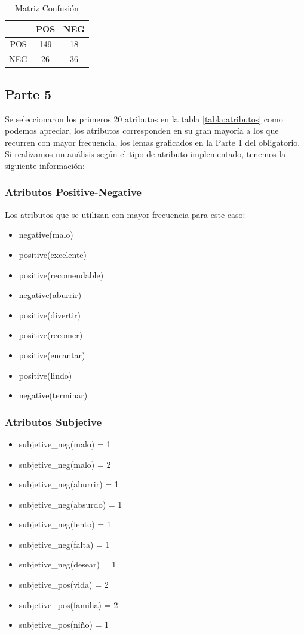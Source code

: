 \documentclass[12pt]{article}
\begin{document}
\begin{table}[!htb]
\begin{center}
\begin{tabular}{|c|c|c|} 
\cline{2-3}
 \multicolumn{1}{l}{}&
 \multicolumn{1}{|l}{POS}&
 \multicolumn{1}{|l|}{NEG}
\tabularnewline
  \hline
  POS & 149 & 18 \\ \hline
  NEG & 26 & 36 \\ \hline
\end{tabular} 
\end{center}
\caption{Matriz Confusión} 
\label{tabla:matrix}
\end{table}

\subsection{Parte 5} \label{sub:part5}
Se seleccionaron los primeros 20 atributos en la tabla \ref{tabla:atributos} como podemos apreciar, los atributos corresponden en su gran mayoría a los que recurren con mayor frecuencia, los lemas graficados en la Parte 1 del obligatorio. Si realizamos un análisis según el tipo de atributo implementado, tenemos la siguiente información:
\subsubsection{Atributos Positive-Negative}
Los atributos que se utilizan con mayor frecuencia para este caso:
\begin{itemize}
  \item negative(malo)
  \item positive(excelente)
  \item positive(recomendable)
  \item negative(aburrir)
  \item positive(divertir)
  \item positive(recomer)
  \item positive(encantar)
  \item positive(lindo)
  \item negative(terminar)
\end{itemize}

\subsubsection{Atributos Subjetive}
\begin{itemize}
  \item subjetive\_neg(malo) = 1
  \item subjetive\_neg(malo) = 2
  \item subjetive\_neg(aburrir) = 1
  \item subjetive\_neg(absurdo) = 1
  \item subjetive\_neg(lento) = 1
  \item subjetive\_neg(falta) = 1
  \item subjetive\_neg(desear) = 1
  \item subjetive\_pos(vida) = 2
  \item subjetive\_pos(familia) = 2
  \item subjetive\_pos(niño) = 1
\end{itemize}
\end{document}
